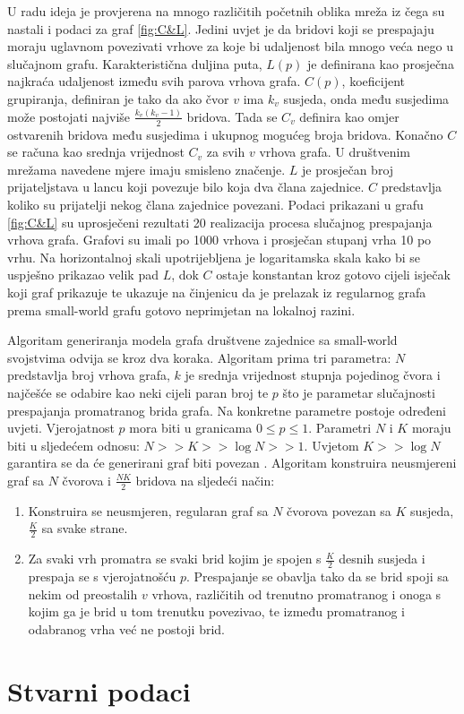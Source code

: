 U radu\cite{watts1998collective} ideja je provjerena na mnogo različitih početnih oblika mreža iz čega su nastali i podaci za graf \ref{fig:C&L}. Jedini uvjet je da bridovi koji se prespajaju moraju uglavnom povezivati vrhove za koje bi udaljenost bila mnogo veća nego u slučajnom grafu. Karakteristična duljina puta, $L(p)$ je definirana kao prosječna najkraća udaljenost između svih parova vrhova grafa. $C(p)$, koeficijent grupiranja, definiran je tako da ako čvor $v$ ima $k_{v}$ susjeda, onda među susjedima može postojati najviše $\frac{k_{v}(k_{v} - 1)}{2}$ bridova. Tada se $C_{v}$ definira kao omjer ostvarenih bridova među susjedima i ukupnog mogućeg broja bridova. Konačno $C$ se računa kao srednja vrijednost $C_{v}$ za svih $v$ vrhova grafa. U društvenim mrežama navedene mjere imaju smisleno značenje. $L$ je prosječan broj prijateljstava u lancu koji povezuje bilo koja dva člana zajednice. $C$ predstavlja koliko su prijatelji nekog člana zajednice povezani. Podaci prikazani u grafu \ref{fig:C&L} su uprosječeni rezultati 20 realizacija procesa slučajnog prespajanja vrhova grafa. Grafovi su imali po 1000 vrhova i prosječan stupanj vrha 10 po vrhu. Na horizontalnoj skali upotrijebljena je logaritamska skala kako bi se uspješno prikazao velik pad  $L$, dok $C$ ostaje konstantan kroz gotovo cijeli isječak koji graf prikazuje te ukazuje na činjenicu da je prelazak iz regularnog grafa prema small-world grafu gotovo neprimjetan na lokalnoj razini.


Algoritam generiranja modela grafa društvene zajednice sa small-world svojstvima odvija se kroz dva koraka. Algoritam prima tri parametra: $N$ predstavlja broj vrhova grafa, $k$ je srednja vrijednost stupnja pojedinog čvora i najčešće se odabire kao neki cijeli paran broj te $p$ što je parametar slučajnosti prespajanja promatranog brida grafa. Na konkretne parametre postoje određeni uvjeti. Vjerojatnost $p$ mora biti u granicama $0 \leq p \leq 1$. Parametri $N$ i $K$ moraju biti u sljedećem odnosu: $N >> K >> \log N >> 1$. Uvjetom $ K >> \log N$ garantira se da će generirani graf biti povezan \cite{Bollobas2001}. Algoritam konstruira neusmjereni graf sa $N$ čvorova i $\frac{NK}{2}$ bridova na sljedeći način:

\begin{enumerate}
	\item Konstruira se neusmjeren, regularan graf sa $N$ čvorova povezan sa $K$ susjeda, $\frac{K}{2}$ sa svake strane.
	\item Za svaki vrh promatra se svaki brid kojim je spojen s $\frac{K}{2}$ desnih susjeda i prespaja se s vjerojatnošću $p$. Prespajanje se obavlja tako da se brid spoji sa nekim od preostalih $v$ vrhova, različitih od trenutno promatranog i onoga s kojim ga je brid u tom trenutku povezivao, te između promatranog i odabranog vrha već ne postoji brid.
\end{enumerate}


\section{Stvarni podaci}